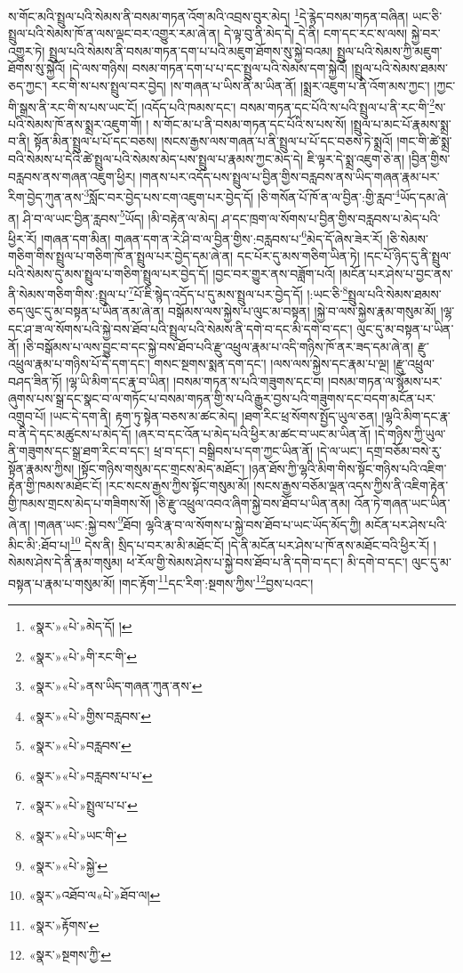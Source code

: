 ས་གོང་མའི་སྤྲུལ་པའི་སེམས་ནི་བསམ་གཏན་འོག་མའི་འབྲས་བུར་མེད། \footnote{«སྣར་»«པེ་»མེད་དོ། ། }དེ་རྙེད་བསམ་གཏན་བཞིན། ཡང་ཅི་སྤྲུལ་པའི་སེམས་ཁོ་ན་ལས་ལྡང་བར་འགྱུར་རམ་ཞེ་ན། དེ་ལྟ་བུ་ནི་མེད་དེ། དེ་ནི། ངག་དང་རང་ས་ལས། སྐྱེ་བར་འགྱུར་ཏེ། སྤྲུལ་པའི་སེམས་ནི་བསམ་གཏན་དག་པ་པའི་མཇུག་ཐོགས་སུ་སྐྱེ་བའམ། སྤྲུལ་པའི་སེམས་ཀྱི་མཇུག་ཐོགས་སུ་སྐྱེའོ། །དེ་ལས་གཉིས། བསམ་གཏན་དག་པ་པ་དང་སྤྲུལ་པའི་སེམས་དག་སྐྱེའོ། །སྤྲུལ་པའི་སེམས་ཐམས་ཅད་ཀྱང་། རང་གི་ས་པས་སྤྲུལ་བར་བྱེད། །ས་གཞན་པ་ཡིས་ནི་མ་ཡིན་ནོ། །སྨྲར་འཇུག་པ་ནི་འོག་མས་ཀྱང་། །ཀྱང་གི་སྒྲས་ནི་རང་གི་ས་པས་ཡང་ངོ། །འདོད་པའི་ཁམས་དང་། བསམ་གཏན་དང་པོའི་ས་པའི་སྤྲུལ་པ་ནི་རང་གི་\footnote{«སྣར་»«པེ་»གི་རང་གི་}ས་པའི་སེམས་ཁོ་ནས་སྨྲར་འཇུག་གོ། །
ས་གོང་མ་པ་ནི་བསམ་གཏན་དང་པོའི་ས་པས་སོ། །སྤྲུལ་པ་མང་པོ་རྣམས་སྨྲ་བ་ནི། སྟོན་མིན་སྤྲུལ་པ་པོ་དང་བཅས། །སངས་རྒྱས་ལས་གཞན་པ་ནི་སྤྲུལ་པ་པོ་དང་བཅས་ཏེ་སྨྲའོ། །གང་གི་ཚེ་སྨྲ་བའི་སེམས་པ་དེའི་ཚེ་སྤྲུལ་པའི་སེམས་མེད་པས་སྤྲུལ་པ་རྣམས་ཀྱང་མེད་དེ། ཇི་ལྟར་དེ་སྨྲ་འཇུག་ཅེ་ན། །བྱིན་གྱིས་བརླབས་ནས་གཞན་འཇུག་ཕྱིར། །གནས་པར་འདོད་པས་སྤྲུལ་པ་བྱིན་གྱིས་བརླབས་ནས་ཡིད་གཞན་རྣམ་པར་རིག་བྱེད་ཀུན་ནས་\footnote{«སྣར་»«པེ་»ནས་ཡིད་གཞན་ཀུན་ནས་}སློང་བར་བྱེད་པས་ངག་འཇུག་པར་བྱེད་དོ། །ཅི་གསོན་པོ་ཁོ་ན་ལ་བྱིན་:གྱི་རླབ་\footnote{«སྣར་»«པེ་»གྱིས་བརླབས་}ཡོད་དམ་ཞེ་ན། ཤི་བ་ལ་ཡང་བྱིན་རླབས་\footnote{«སྣར་»«པེ་»བརླབས་}ཡོད། །མི་བརྟེན་ལ་མེད། ཤ་དང་ཁྲག་ལ་སོགས་པ་བྱིན་གྱིས་བརླབས་པ་མེད་པའི་ཕྱིར་རོ། །གཞན་དག་མིན། གཞན་དག་ན་རེ་ཤི་བ་ལ་བྱིན་གྱིས་:བརླབས་པ་\footnote{«སྣར་»«པེ་»བརླབས་པ་པ་}མེད་དོ་ཞེས་ཟེར་རོ། །ཅི་སེམས་གཅིག་གིས་སྤྲུལ་པ་གཅིག་ཁོ་ན་སྤྲུལ་པར་བྱེད་དམ་ཞེ་ན། དང་པོར་དུ་མས་གཅིག་ཡིན་ཏེ། །དང་པོ་ཉིད་དུ་ནི་སྤྲུལ་པའི་སེམས་དུ་མས་སྤྲུལ་པ་གཅིག་སྤྲུལ་པར་བྱེད་དོ། །བྱང་བར་གྱུར་ནས་བཟློག་པའོ། །མངོན་པར་ཤེས་པ་བྱང་ནས་ནི་སེམས་གཅིག་གིས་:སྤྲུལ་པ་\footnote{«སྣར་»«པེ་»སྤྲུལ་པ་པ་}པོ་ཇི་སྙེད་འདོད་པ་དུ་མས་སྤྲུལ་པར་བྱེད་དོ། །:ཡང་ཅི་\footnote{«སྣར་»«པེ་»ཡང་གི་}སྤྲུལ་པའི་སེམས་ཐམས་ཅད་ལུང་དུ་མ་བསྟན་པ་ཡིན་ནམ་ཞེ་ན། བསྒོམས་ལས་སྐྱེས་པ་ལུང་མ་བསྟན། །སྐྱེ་བ་ལས་སྐྱེས་རྣམ་གསུམ་མོ། །ལྷ་དང་ཤ་ཟ་ལ་སོགས་པའི་སྐྱེ་བས་ཐོབ་པའི་སྤྲུལ་པའི་སེམས་ནི་དགེ་བ་དང་མི་དགེ་བ་དང་། ལུང་དུ་མ་བསྟན་པ་ཡིན་ནོ། །ཅི་བསྒོམས་པ་ལས་བྱུང་བ་དང་སྐྱེ་བས་ཐོབ་པའི་རྫུ་འཕྲུལ་རྣམ་པ་འདི་གཉིས་ཁོ་ནར་ཟད་དམ་ཞེ་ན། རྫུ་འཕྲུལ་རྣམ་པ་གཉིས་པོ་དེ་དག་དང་། གསང་སྔགས་སྨན་དག་དང་། །ལས་ལས་སྐྱེས་དང་རྣམ་པ་ལྔ། །རྫུ་འཕྲུལ་བཤད་ཟིན་ཏོ། །ལྷ་ཡི་མིག་དང་རྣ་བ་ཡིན། །བསམ་གཏན་ས་པའི་གཟུགས་དང་བ། །བསམ་གཏན་ལ་སྙོམས་པར་ཞུགས་པས་སྒྲ་དང་སྣང་བ་ལ་གཏོང་པ་བསམ་གཏན་གྱི་ས་པའི་རྒྱུར་བྱས་པའི་གཟུགས་དང་བདག་མངོན་པར་འགྲུབ་པོ། །ཡང་དེ་དག་ནི། རྟག་ཏུ་སྟེན་བཅས་མ་ཚང་མེད། །ཐག་རིང་ཕྲ་སོགས་སྤྱོད་ཡུལ་ཅན། །ལྷའི་མིག་དང་རྣ་བ་ནི་དེ་དང་མཚུངས་པ་མེད་དོ། །ཞར་བ་དང་འོན་པ་མེད་པའི་ཕྱིར་མ་ཚང་བ་ཡང་མ་ཡིན་ནོ། །དེ་གཉིས་ཀྱི་ཡུལ་ནི་གཟུགས་དང་སྒྲ་ཐག་རིང་བ་དང་། ཕྲ་བ་དང་། བསྒྲིབས་པ་དག་ཀྱང་ཡིན་ནོ། །དེ་ལ་ཡང་། དགྲ་བཅོམ་བསེ་རུ་སྟོན་རྣམས་ཀྱིས། །སྟོང་གཉིས་གསུམ་དང་གྲངས་མེད་མཐོང་། །ཉན་ཐོས་ཀྱི་ལྷའི་མིག་གིས་སྟོང་གཉིས་པའི་འཇིག་རྟེན་གྱི་ཁམས་མཐོང་ངོ། །རང་སངས་རྒྱས་ཀྱིས་སྟོང་གསུམ་མོ། །སངས་རྒྱས་བཅོམ་ལྡན་འདས་ཀྱིས་ནི་འཇིག་རྟེན་གྱི་ཁམས་གྲངས་མེད་པ་གཟིགས་སོ། །ཅི་རྫུ་འཕྲུལ་འབའ་ཞིག་སྐྱེ་བས་ཐོབ་པ་ཡིན་ནམ། འོན་ཏེ་གཞན་ཡང་ཡིན་ཞེ་ན། །གཞན་ཡང་:སྐྱེ་བས་\footnote{«སྣར་»«པེ་»སྐྱེ་}ཐོབ། ལྷའི་རྣ་བ་ལ་སོགས་པ་སྐྱེ་བས་ཐོབ་པ་ཡང་ཡོད་མོད་ཀྱི། མངོན་པར་ཤེས་པའི་མིང་མི་:ཐོབ་པ།\footnote{«སྣར་»འཐོབ་ལ«པེ་»ཐོབ་ལ།} དེས་ནི། སྲིད་པ་བར་མ་མི་མཐོང་ངོ། །དེ་ནི་མངོན་པར་ཤེས་པ་ཁོ་ནས་མཐོང་བའི་ཕྱིར་རོ། །སེམས་ཤེས་དེ་ནི་རྣམ་གསུམ། ཕ་རོལ་གྱི་སེམས་ཤེས་པ་སྐྱེ་བས་ཐོབ་པ་ནི་དགེ་བ་དང་། མི་དགེ་བ་དང་། ལུང་དུ་མ་བསྟན་པ་རྣམ་པ་གསུམ་མོ། །གང་རྟོག་\footnote{«སྣར་»རྟོགས་}དང་རིག་:སྔགས་ཀྱིས་\footnote{«སྣར་»སྔགས་ཀྱི་}བྱས་པའང་། 